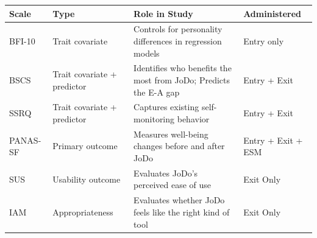 \documentclass[12pt]{article}
\begin{document}
\begin{tabularx}{\textwidth}{|>{\raggedright\arraybackslash}X
                              |>{\raggedright\arraybackslash}X
                              |>{\raggedright\arraybackslash}X
                              |>{\raggedright\arraybackslash}X|}
\hline
\textbf{Scale} & \textbf{Type} & \textbf{Role in Study} & \textbf{Administered} \\
\hline
BFI-10 & Trait covariate & Controls for personality differences in regression models & Entry only \\
\hline
BSCS & Trait covariate + predictor & Identifies who benefits the most from JoDo; Predicts the E-A gap & Entry + Exit \\
\hline
SSRQ & Trait covariate + predictor & Captures existing self-monitoring behavior & Entry + Exit \\
\hline
PANAS-SF & Primary outcome & Measures well-being changes before and after JoDo & Entry + Exit + ESM \\
\hline
SUS & Usability outcome & Evaluates JoDo's perceived ease of use & Exit Only \\
\hline
IAM & Appropriateness & Evaluates whether JoDo feels like the right kind of tool & Exit Only \\
\hline
\end{tabularx}
\clearpage


\end{document}
